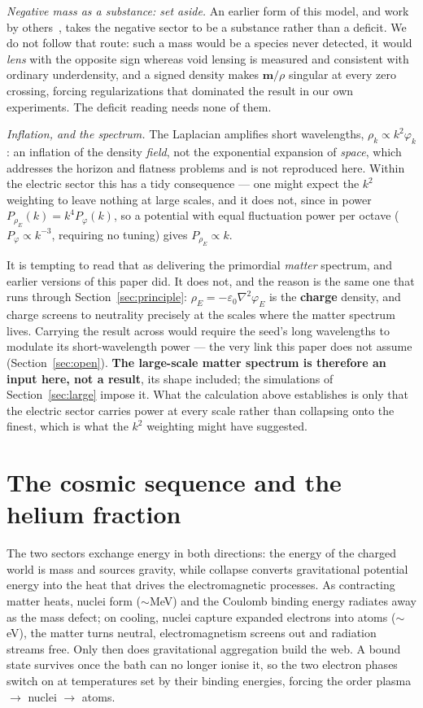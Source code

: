 \documentclass[11pt]{article}
\newcommand{\grad}{\nabla}
\begin{document}
\emph{Negative mass as a substance: set aside.} An earlier form of this model, and work by
others~\cite{farnes,petit,hossenfelder}, takes the negative sector to be a substance rather than a deficit. We do
not follow that route: such a mass would be a species never detected, it would \emph{lens} with the opposite sign
whereas void lensing is measured and consistent with ordinary underdensity, and a signed density makes
$\mathbf m/\rho$ singular at every zero crossing, forcing regularizations that dominated the result in our own
experiments. The deficit reading needs none of them.

\emph{Inflation, and the spectrum.} The Laplacian amplifies short wavelengths, $\rho_k\propto k^2\varphi_k$: an
inflation of the density \emph{field}, not the exponential expansion of \emph{space}, which addresses the horizon
and flatness problems and is not reproduced here. Within the electric sector this has a tidy consequence --- one
might expect the $k^2$ weighting to leave nothing at large scales, and it does not, since in power
$P_{\rho_E}(k)=k^4P_{\varphi}(k)$, so a potential with equal fluctuation power per octave
($P_\varphi\propto k^{-3}$, requiring no tuning) gives $P_{\rho_E}\propto k$.

It is tempting to read that as delivering the primordial \emph{matter} spectrum, and earlier versions of this
paper did. It does not, and the reason is the same one that runs through Section~\ref{sec:principle}:
$\rho_E=-\varepsilon_0\grad^2\varphi_E$ is the \textbf{charge} density, and charge screens to neutrality precisely
at the scales where the matter spectrum lives. Carrying the result across would require the seed's long
wavelengths to modulate its short-wavelength power --- the very link this paper does not assume
(Section~\ref{sec:open}). \textbf{The large-scale matter spectrum is therefore an input here, not a result}, its
shape included; the simulations of Section~\ref{sec:large} impose it. What the calculation above establishes is
only that the electric sector carries power at every scale rather than collapsing onto the finest, which is what
the $k^2$ weighting might have suggested.

\section{The cosmic sequence and the helium fraction}\label{sec:sequence}
The two sectors exchange energy in both directions: the energy of the charged world is mass and sources gravity,
while collapse converts gravitational potential energy into the heat that drives the electromagnetic processes. As
contracting matter heats, nuclei form (${\sim}$MeV) and the Coulomb binding energy radiates away as the mass
defect; on cooling, nuclei capture expanded electrons into atoms (${\sim}$eV), the matter turns neutral,
electromagnetism screens out and radiation streams free. Only then does gravitational aggregation build the web. A
bound state survives once the bath can no longer ionise it, so the two electron phases switch on at temperatures
set by their binding energies, forcing the order plasma $\to$ nuclei $\to$ atoms.
\end{document}

